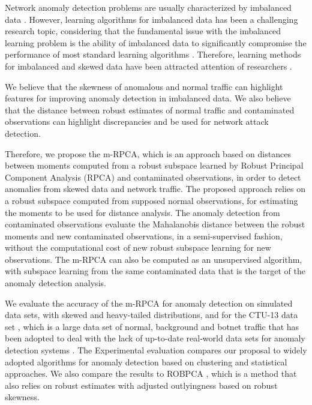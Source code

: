 Network anomaly detection problems are usually characterized by imbalanced data \cite{Phua2004minority,he2008learning,benson2010network}. However, learning algorithms for imbalanced data has been a challenging research topic, considering that the fundamental issue with the imbalanced learning problem is the ability of imbalanced data to significantly compromise the performance of most standard learning algorithms \cite{he2008learning}. Therefore, learning methods for imbalanced and skewed data have been attracted attention of researchers \cite{Phua2004minority,hubert2009robustskewed}.

We believe that the skewness of anomalous and normal traffic can highlight features for improving anomaly detection in imbalanced data. We also believe that the distance between robust estimates of normal traffic and contaminated observations can highlight discrepancies and be used for network attack detection. 

Therefore, we propose the m-RPCA, which is an approach based on distances between moments computed from a robust subspace learned by Robust Principal Component Analysis (RPCA) and contaminated observations, in order to detect anomalies from skewed data and network traffic. The proposed approach relies on a robust subspace computed from supposed normal observations, for estimating the moments to be used for distance analysis. The anomaly detection from contaminated observations evaluate the Mahalanobis distance between the robust moments and new contaminated observations, in a semi-supervised fashion, without the computational cost of new robust subspace learning for new observations. The m-RPCA can also be computed as an unsupervised algorithm, with subspace learning from the same contaminated data that is the target of the anomaly detection analysis.

We evaluate the accuracy of the m-RPCA for anomaly detection on simulated data sets, with skewed and heavy-tailed distributions, and for the CTU-13 data set \cite{garcia2014empirical}, which is a large data set of normal, background and botnet traffic that has been adopted to deal with the lack of up-to-date real-world data sets for anomaly detection systems \cite{osanaiye2016distributed}. The Experimental evaluation compares our proposal to widely adopted algorithms for anomaly detection based on clustering and statistical approaches. We also compare the results to ROBPCA \cite{hubert2005robpca}, which is a method that also relies on robust estimates with adjusted outlyingness based on robust skewness.

